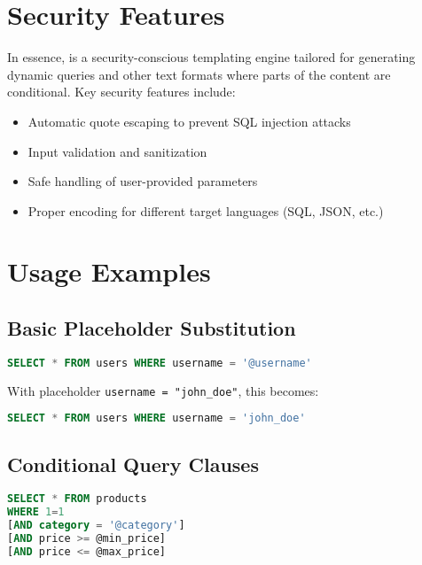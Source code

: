 \section{Security Features}
\label{sec:wbpl-security}

In essence, \wbpl{} is a security-conscious templating engine tailored for generating dynamic queries and other text formats where parts of the content are conditional. Key security features include:

\begin{itemize}
\item Automatic quote escaping to prevent SQL injection attacks
\item Input validation and sanitization
\item Safe handling of user-provided parameters
\item Proper encoding for different target languages (SQL, JSON, etc.)
\end{itemize}

\section{Usage Examples}
\label{sec:wbpl-examples}

\subsection{Basic Placeholder Substitution}

\begin{lstlisting}[language=SQL,caption={Simple WBPL Substitution}]
SELECT * FROM users WHERE username = '@username'
\end{lstlisting}

With placeholder \texttt{username = "john\_doe"}, this becomes:
\begin{lstlisting}[language=SQL]
SELECT * FROM users WHERE username = 'john_doe'
\end{lstlisting}

\subsection{Conditional Query Clauses}

\begin{lstlisting}[language=SQL,caption={WBPL Conditional Blocks}]
SELECT * FROM products 
WHERE 1=1 
[AND category = '@category'] 
[AND price >= @min_price] 
[AND price <= @max_price]
\end{lstlisting}

